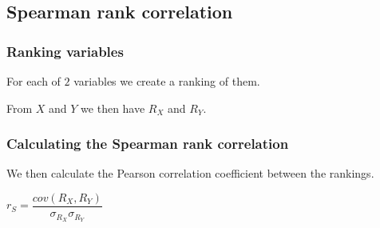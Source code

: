 
\subsection{Spearman rank correlation}

\subsubsection{Ranking variables}

For each of \(2\) variables we create a ranking of them.

From \(X\) and \(Y\) we then have \(R_X\) and \(R_Y\).

\subsubsection{Calculating the Spearman rank correlation}

We then calculate the Pearson correlation coefficient between the rankings.

\(r_S=\dfrac{cov(R_X, R_Y)}{\sigma_{R_X}\sigma_{R_Y}}\)

